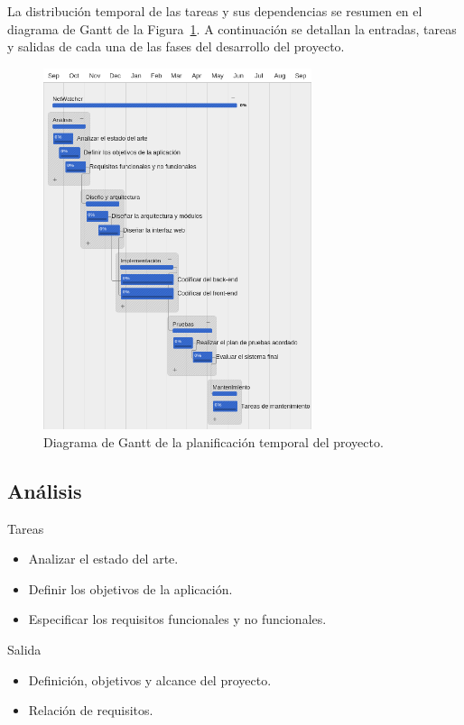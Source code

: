La distribución temporal de las tareas y sus dependencias se resumen en el diagrama de Gantt de la Figura~\ref{fig:gantt}.
A continuación se detallan la entradas, tareas y salidas de cada una de las fases del desarrollo del proyecto.

\begin{figure}[!htp]
  \centering
  \includegraphics[width=0.7\textwidth,clip=true]{graphics/gantt_white}
  \caption{Diagrama de Gantt de la planificación temporal del proyecto.}
  \label{fig:gantt}
\end{figure}

\subsection*{Análisis\label{ssec:dp:analisis}}

Tareas
\begin{itemize}[leftmargin=3.5em]
  \item Analizar el estado del arte.
  \item Definir los objetivos de la aplicación.
  \item Especificar los requisitos funcionales y no funcionales.
\end{itemize}

Salida
\begin{itemize}[leftmargin=3.5em]
  \item Definición, objetivos y alcance del proyecto.
  \item Relación de requisitos.
\end{itemize}

